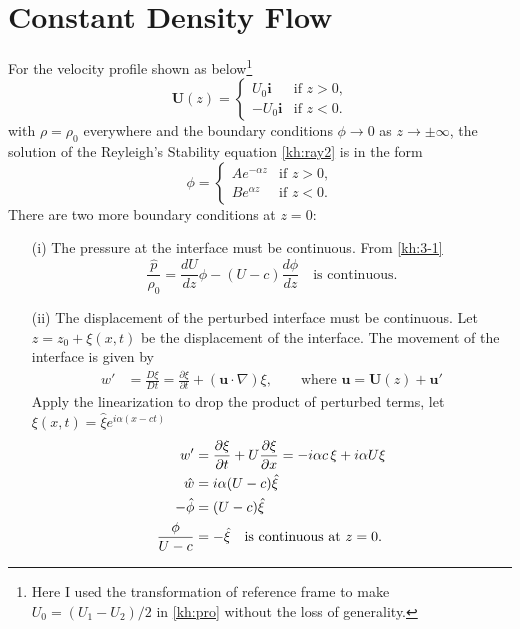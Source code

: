 \section{Constant Density Flow}
For the velocity profile shown as below\footnote{Here I used the
transformation of reference frame to make $U_0=(U_1-U_2)/2$ in
\eqref{kh:pro} without the loss of generality.}
\begin{equation}\label{kh:bg}
\mathbf{U}(z) =
\begin{cases} U_0 \mathbf{i} &\text{if $z>0$,}\\
-U_0 \mathbf{i} &\text{if $z<0$.}
\end{cases}
\end{equation}
with $\rho=\rho_0$ everywhere and the boundary conditions $\phi \to
0$ as $z \to \pm\infty$, the solution of the Reyleigh's Stability
equation \eqref{kh:ray2} is in the form
\begin{equation*}
\phi =
\begin{cases}
Ae^{-\alpha z} &\text{if $z>0$,}\\
Be^{\alpha z} &\text{if $z<0$.}
\end{cases}
\end{equation*}
There are two more boundary conditions at $z=0$:
\begin{enumerate}
  \item[(i)] The pressure at the interface must be continuous. From \eqref{kh:3-1}
  \begin{equation}
  \frac{\hat{p}}{\rho_0}=\frac{dU}{dz}\phi-(U-c)\frac{d\phi}{dz}\quad\text{is continuous.}\label{kh:b1}
  \end{equation}
  \item[(ii)] The displacement of the perturbed interface must be continuous. Let $z=z_0+\xi(x,t)$ be
  the displacement of the interface. The movement of the interface is given
  by
  \begin{align*}
  w'&=\frac{D\xi}{Dt}=\frac{\partial\xi}{\partial
  t}+(\mathbf{u}\cdot\nabla)\xi,\qquad
  \text{where }\mathbf{u}=\mathbf{U}(z)+\mathbf{u}'
  \end{align*}
  Apply the linearization to drop the product of perturbed terms,
  let $\xi(x,t)=\hat{\xi}e^{i\alpha(x-ct)}$
  \begin{align}
  w'&=\frac{\partial\xi}{\partial t}+U\frac{\partial\xi}{\partial
  x}=-i\alpha c\,\xi+i\alpha U\xi\notag\\
  \hat{w}&=i\alpha(U-c)\hat{\xi}\notag\\
  -\hat{\phi}&=(U-c)\hat{\xi}\notag\\
  \frac{\phi}{U-c}&=-\hat{\xi}\quad\text{is continuous at $z=0$.}\label{kh:b2}
  \end{align}
\end{enumerate}
